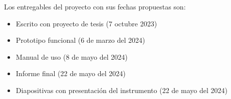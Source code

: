 %
Los entregables del proyecto  con sus fechas propuestas son:

\begin{itemize}
	\item Escrito con proyecto de tesis (7 octubre 2023)
	\item Prototipo funcional (6 de marzo del 2024)
	\item Manual de uso (8 de mayo del 2024)
	\item Informe final (22 de mayo del 2024)
	\item Diapositivas con presentación del instrumento (22 de mayo del 2024)
\end{itemize}
%
